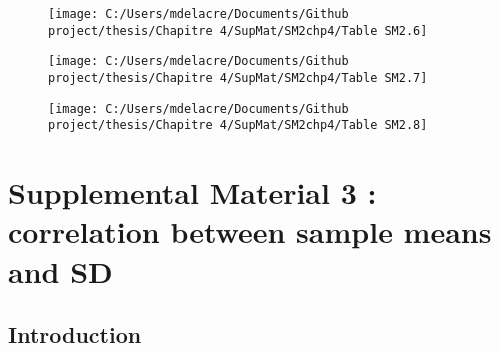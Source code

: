 \documentclass[
  english,
  man,mask,floatsintext]{apa6}
\begin{document}
\begin{landscape}
\newpage

\begin{figure}

{\centering \texttt{[image: C:/Users/mdelacre/Documents/Github project/thesis/Chapitre 4/SupMat/SM2chp4/Table SM2.6]} 

}

\end{figure}

\end{landscape}
\begin{landscape}
\newpage

\begin{figure}

{\centering \texttt{[image: C:/Users/mdelacre/Documents/Github project/thesis/Chapitre 4/SupMat/SM2chp4/Table SM2.7]} 

}

\end{figure}

\end{landscape}
\begin{landscape}
\newpage

\begin{figure}

{\centering \texttt{[image: C:/Users/mdelacre/Documents/Github project/thesis/Chapitre 4/SupMat/SM2chp4/Table SM2.8]} 

}

\end{figure}

\end{landscape}

\newpage

\hypertarget{supplemental-material-3-correlation-between-sample-means-and-bmsd}{%
\section{\texorpdfstring{Supplemental Material 3 : correlation between sample means and \(\bm{SD}\)}{Supplemental Material 3 : correlation between sample means and \textbackslash bm\{SD\}}}\label{supplemental-material-3-correlation-between-sample-means-and-bmsd}}

\hypertarget{introduction}{%
\subsection{Introduction}\label{introduction}}
\end{document}
